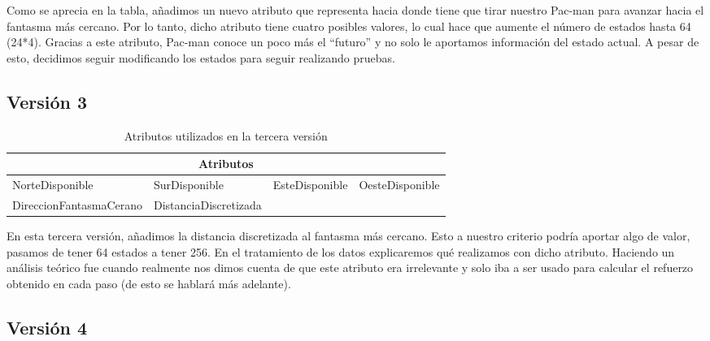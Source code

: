 \documentclass[11pt,a4paper]{article}
\begin{document}
Como se aprecia en la tabla, añadimos un nuevo atributo que representa hacia donde tiene que tirar nuestro Pac-man para avanzar hacia el fantasma más cercano. Por lo tanto, dicho atributo tiene cuatro posibles valores, lo cual hace que aumente el número de estados hasta 64 (24*4). 
Gracias a este atributo, Pac-man conoce un poco más el “futuro” y no solo le aportamos información del estado actual. A pesar de esto, decidimos seguir modificando los estados para seguir realizando pruebas.

\subsection{Versión 3}

\begin{table}[H]
\centering
\label{AtributosV3}
\begin{tabular}{|l|l|ll}
\hline
\multicolumn{4}{|c|}{\textbf{Atributos}} \\ \hline
NorteDisponible & SurDisponible & \multicolumn{1}{l|}{EsteDisponible} & \multicolumn{1}{l|}{OesteDisponible} \\ \hline
DireccionFantasmaCerano & DistanciaDiscretizada &  &  \\ \cline{1-2}
\end{tabular}
\caption{Atributos utilizados en la tercera versión}
\end{table}
En esta tercera versión, añadimos la distancia discretizada al fantasma más cercano. Esto a nuestro criterio podría aportar algo de valor, pasamos de tener 64 estados a tener 256. En el tratamiento de los datos explicaremos qué realizamos con dicho atributo.
Haciendo un análisis teórico fue cuando realmente nos dimos cuenta de que este atributo era irrelevante y solo iba a ser usado para calcular el refuerzo obtenido en cada paso (de esto se hablará más adelante).

\subsection{Versión 4}
\end{document}
